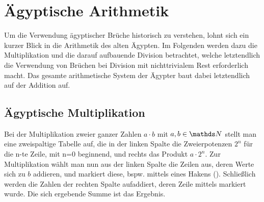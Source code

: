 \section{Ägyptische Arithmetik}
	Um die Verwendung ägyptischer Brüche historisch zu verstehen, lohnt sich ein kurzer Blick in die Arithmetik des alten Ägypten. Im Folgenden werden dazu die Multiplikation und die darauf aufbauende Division betrachtet, welche letztendlich die Verwendung von Brüchen bei Division mit nichttrivialem Rest erforderlich macht. Das gesamte arithmetische System der Ägypter baut dabei letztendlich auf der Addition auf.

\subsection{Ägyptische Multiplikation}\label{subsec:egypMult}
	Bei der Multiplikation zweier ganzer Zahlen $a \cdot b$ mit $a, b \in \N$ stellt man eine zweispaltige Tabelle auf, die in der linken Spalte die Zweierpotenzen $2^{n}$ für die n-te Zeile, mit n=0 beginnend, und rechts das Produkt $a \cdot 2^n$.
	Zur Multiplikation wählt man nun aus der linken Spalte die Zeilen aus, deren Werte sich zu $b$ addieren, und markiert diese, bspw. mittels eines Hakens (\checkmark). Schließlich werden die Zahlen der rechten Spalte aufaddiert, deren Zeile mittels \checkmark markiert wurde. Die sich ergebende Summe ist das Ergebnis.
	
